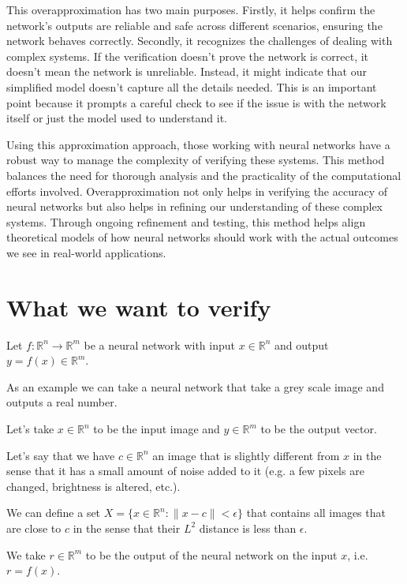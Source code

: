 \documentclass{article}
\begin{document}
This overapproximation has two main purposes. Firstly, it helps confirm the network’s outputs are reliable and safe across different scenarios, ensuring the network behaves correctly. Secondly, it recognizes the challenges of dealing with complex systems. If the verification doesn’t prove the network is correct, it doesn’t mean the network is unreliable. Instead, it might indicate that our simplified model doesn’t capture all the details needed. This is an important point because it prompts a careful check to see if the issue is with the network itself or just the model used to understand it.

Using this approximation approach, those working with neural networks have a robust way to manage the complexity of verifying these systems. This method balances the need for thorough analysis and the practicality of the computational efforts involved. Overapproximation not only helps in verifying the accuracy of neural networks but also helps in refining our understanding of these complex systems. Through ongoing refinement and testing, this method helps align theoretical models of how neural networks should work with the actual outcomes we see in real-world applications.



\section{What we want to verify}

Let \(f : \mathbb{R}^n \to \mathbb{R}^m \) be a neural network with input \(x \in \mathbb{R}^n \) and output \(y = f(x) \in \mathbb{R}^m \). 

As an example we can take a neural network that take a grey scale image and outputs a real number.

Let's take \(x \in \mathbb{R}^n \) to be the input image and \(y \in \mathbb{R}^m \) to be the output vector.

Let's say that we have \( c \in \mathbb{R}^n \) an image that is slightly different from \(x \) in the sense that it has a small amount of noise added to it (e.g. a few pixels are changed, brightness is altered, etc.).

We can define a set \( X = \{x \in \mathbb{R}^n : \|x - c\| < \epsilon \} \) that contains all images that are close to \(c \) in the sense that their \(L^2 \) distance is less than \(\epsilon \).

We take \(r \in \mathbb{R}^m \) to be the output of the neural network on the input \(x \), i.e. \(r = f(x) \).
\end{document}
